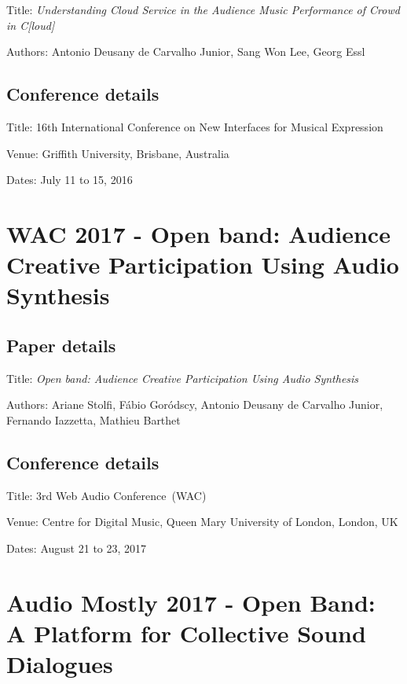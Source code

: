 Title: \textit{Understanding Cloud Service in the Audience Music Performance of Crowd in C[loud]}

Authors: Antonio Deusany de Carvalho Junior, Sang Won Lee, Georg Essl

\subsection*{Conference details}

Title: 16th International Conference on New Interfaces for Musical Expression

Venue: Griffith University, Brisbane, Australia

Dates: July 11 to 15, 2016



\section{WAC 2017 - Open band: Audience Creative Participation Using Audio Synthesis}
\label{ape:paperwac2017}

\subsection*{Paper details}

Title: \textit{Open band: Audience Creative Participation Using Audio Synthesis}

Authors: Ariane Stolfi, Fábio Goródscy, Antonio Deusany de Carvalho Junior, Fernando Iazzetta, Mathieu Barthet

\subsection*{Conference details}

Title: 3rd Web Audio Conference~(WAC)

Venue: Centre for Digital Music, Queen Mary University of London, London, UK

Dates: August 21 to 23, 2017



\section{Audio Mostly 2017 - Open Band: A Platform for Collective Sound Dialogues}
\label{ape:paperam2017}

